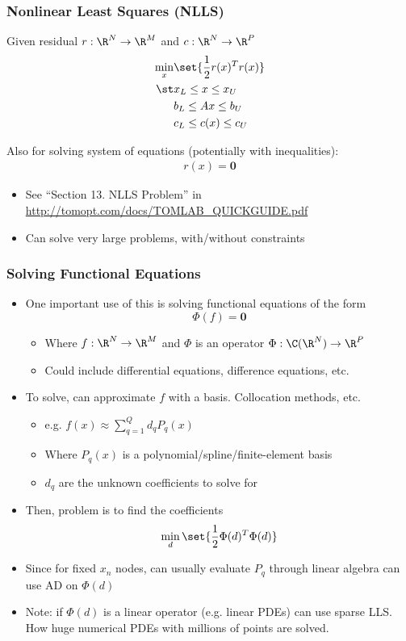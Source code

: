 \documentclass[nofootline]{etk-presentation}
\begin{document}
\begin{frame}[fragile]	\frametitle{Nonlinear Least Squares (NLLS)}
	Given residual $r : \R^N \to \R^M$ and $c : \R^N \to \R^P$
	\begin{align*}
		\min_x &\set{\frac{1}{2}r(x)^T r(x)}\\
		\st & x_L \leq x \leq x_U\\
		& b_L \leq A x \leq b_U\\
		& c_L \leq c(x) \leq c_U
	\end{align*}
	
	Also for solving system of equations (potentially with inequalities):
	\begin{align*}
		r(x) = \mathbf{0}
	\end{align*}
	\begin{itemize}
		\item See ``Section 13. NLLS Problem'' in \url{http://tomopt.com/docs/TOMLAB_QUICKGUIDE.pdf}
		\item Can solve very large problems, with/without constraints
	\end{itemize}
\end{frame}

\begin{frame}[fragile]	\frametitle{Solving Functional Equations}
	\begin{itemize}
\item	One important use of this is solving functional equations of the form
	$$\Phi(f) = \mathbf{0}$$
	\begin{itemize}
		\item Where $f : \R^N \to \R^M$ and $\Phi$ is an operator $\Phi : \C(\R^N) \to \R^P$
		\item Could include differential equations, difference equations, etc.
	\end{itemize}
\item To solve, can approximate $f$ with a basis.  Collocation methods, etc.
\begin{itemize}
	\item e.g. $f(x) \approx \sum_{q=1}^{Q}d_q P_q(x)$
	\item Where $P_q(x)$ is a polynomial/spline/finite-element basis
	\item $d_q$ are the unknown coefficients to solve for
\end{itemize}
\item Then, problem is to find the coefficients
$$
\min_{d} \set{\frac{1}{2}\Phi(d)^T \Phi(d)}
$$
\item Since for fixed $x_n$ nodes, can usually evaluate $P_q$ through linear algebra can use AD on $\Phi(d)$
\item Note: if $\Phi(d)$ is a linear operator (e.g. linear PDEs) can use sparse LLS.  How huge numerical PDEs with millions of points are solved.
\end{itemize}
\end{frame}		
\end{document}
